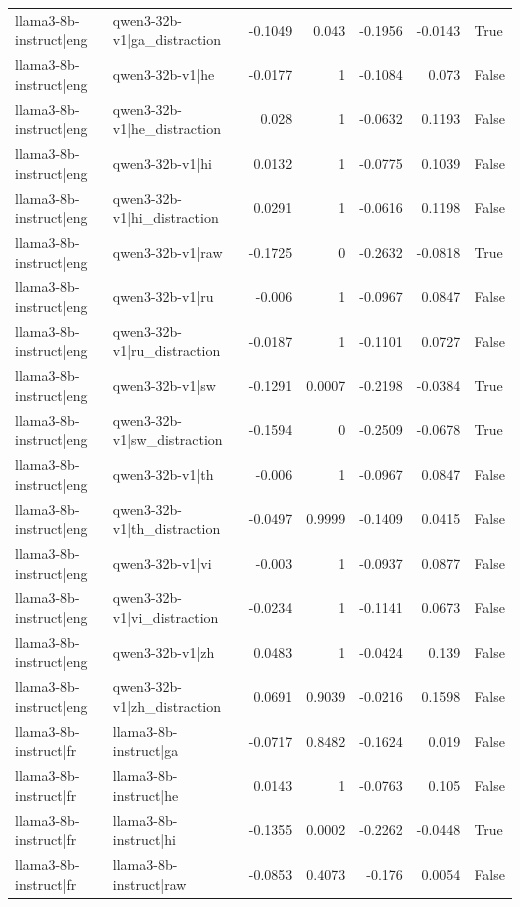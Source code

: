 \begin{table}
\begin{tabular}{l l r r r r l}
llama3-8b-instruct|eng & qwen3-32b-v1|ga_distraction & -0.1049 & 0.043 & -0.1956 & -0.0143 & True \\
llama3-8b-instruct|eng & qwen3-32b-v1|he & -0.0177 & 1 & -0.1084 & 0.073 & False \\
llama3-8b-instruct|eng & qwen3-32b-v1|he_distraction & 0.028 & 1 & -0.0632 & 0.1193 & False \\
llama3-8b-instruct|eng & qwen3-32b-v1|hi & 0.0132 & 1 & -0.0775 & 0.1039 & False \\
llama3-8b-instruct|eng & qwen3-32b-v1|hi_distraction & 0.0291 & 1 & -0.0616 & 0.1198 & False \\
llama3-8b-instruct|eng & qwen3-32b-v1|raw & -0.1725 & 0 & -0.2632 & -0.0818 & True \\
llama3-8b-instruct|eng & qwen3-32b-v1|ru & -0.006 & 1 & -0.0967 & 0.0847 & False \\
llama3-8b-instruct|eng & qwen3-32b-v1|ru_distraction & -0.0187 & 1 & -0.1101 & 0.0727 & False \\
llama3-8b-instruct|eng & qwen3-32b-v1|sw & -0.1291 & 0.0007 & -0.2198 & -0.0384 & True \\
llama3-8b-instruct|eng & qwen3-32b-v1|sw_distraction & -0.1594 & 0 & -0.2509 & -0.0678 & True \\
llama3-8b-instruct|eng & qwen3-32b-v1|th & -0.006 & 1 & -0.0967 & 0.0847 & False \\
llama3-8b-instruct|eng & qwen3-32b-v1|th_distraction & -0.0497 & 0.9999 & -0.1409 & 0.0415 & False \\
llama3-8b-instruct|eng & qwen3-32b-v1|vi & -0.003 & 1 & -0.0937 & 0.0877 & False \\
llama3-8b-instruct|eng & qwen3-32b-v1|vi_distraction & -0.0234 & 1 & -0.1141 & 0.0673 & False \\
llama3-8b-instruct|eng & qwen3-32b-v1|zh & 0.0483 & 1 & -0.0424 & 0.139 & False \\
llama3-8b-instruct|eng & qwen3-32b-v1|zh_distraction & 0.0691 & 0.9039 & -0.0216 & 0.1598 & False \\
llama3-8b-instruct|fr & llama3-8b-instruct|ga & -0.0717 & 0.8482 & -0.1624 & 0.019 & False \\
llama3-8b-instruct|fr & llama3-8b-instruct|he & 0.0143 & 1 & -0.0763 & 0.105 & False \\
llama3-8b-instruct|fr & llama3-8b-instruct|hi & -0.1355 & 0.0002 & -0.2262 & -0.0448 & True \\
llama3-8b-instruct|fr & llama3-8b-instruct|raw & -0.0853 & 0.4073 & -0.176 & 0.0054 & False \\

\end{tabular}
\end{table}
